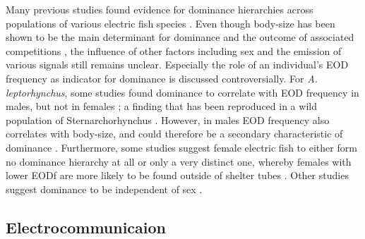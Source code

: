 \documentclass[11pt,pdftex]{article}
\newcommand{\lepto}{\textit{A. leptorhynchus}}
\begin{document}
Many previous studies found evidence for dominance hierarchies across populations of various electric fish species \citep{Dunlap2002, Stamper2010, Fugere2011, Silva2012}. Even though body-size has been shown to be the main determinant for dominance and the outcome of associated competitions \citep{Dunlap2002, Triefenbach2008, Silva2012}, the influence of other factors including sex and the emission of various signals still remains unclear. Especially the role of an individual's EOD frequency as indicator for dominance is discussed controversially. For \lepto{}, some studies found dominance to correlate with EOD frequency in males, but not in females \citep{Hagedorn1985, Dunlap2002}; a finding that has been reproduced in a wild population of Sternarchorhynchus \citep{Fugere2011}. However, in males EOD frequency also correlates with body-size, and could therefore be a secondary characteristic of dominance \citep{Dunlap2002, Triefenbach2008, Fugere2011}. Furthermore, some studies suggest female electric fish to either form no dominance hierarchy at all \citep{Hagedorn1985} or only a very distinct one, whereby females with lower EODf are more likely to be found outside of shelter tubes \citep{Dunlap2002}. Other studies suggest dominance to be independent of sex \citep{Silva2012, Zubizarreta2020}. 

\subsection{Electrocommunicaion}
\end{document}
